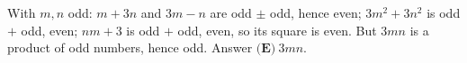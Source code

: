 With $m,n$ odd: $m+3n$ and $3m-n$ are odd $\pm$ odd, hence even; $3m^2+3n^2$ is odd $+$ odd, even; $nm+3$ is odd $+$ odd, even, so its square is even. But $3mn$ is a product of odd numbers, hence odd. Answer $\boxed{\textbf{(E)}\ 3mn}$.
